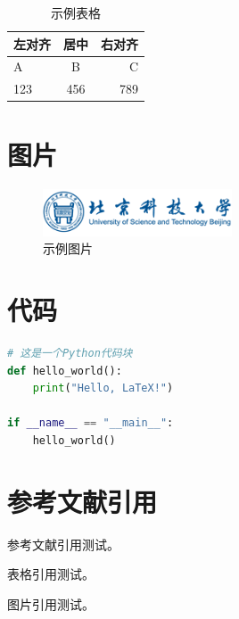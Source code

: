 \begin{table}[h]
\begin{tabular}{lcr}
\toprule
左对齐 & 居中 & 右对齐 \\
\midrule
A & B & C \\
123 & 456 & 789 \\
\bottomrule
\end{tabular}
\centering
\caption{示例表格}
\label{tab:example}
\end{table}

\section{图片}

\begin{figure}[h]
  \centering
  \includegraphics[width=0.5\textwidth]{imgs/logo.png}
  \caption{示例图片}
  \label{fig:example}
\end{figure}

\section{代码}

\begin{lstlisting}[language=Python]
# 这是一个Python代码块
def hello_world():
    print("Hello, LaTeX!")

if __name__ == "__main__":
    hello_world()
\end{lstlisting}

\section{参考文献引用}

参考文献引用测试\cite{xu2025, Wangyan2024, wu2023enhance}。

表格引用测试。

图片引用测试。

